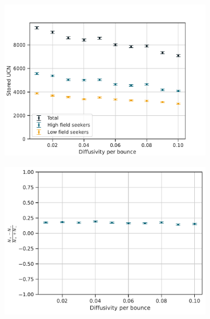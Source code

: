 \begin{figure}
\centering
\begin{subfigure}{.5\textwidth}
  \centering
  \includegraphics[width=\textwidth]{figures/stored_ucn_diffuse.pdf}
  \vspace{0pt}
  \caption{}\label{subfig:diffuse_storage_counts}
\end{subfigure}%
\begin{subfigure}{.5\textwidth}
  \centering
  \includegraphics[width=\textwidth]{figures/storage_spin_contrast_diffuse.pdf}
  \vspace{-7pt}
  \caption{}\label{subfig:diffuse_storage_contrast}
\end{subfigure}

\end{figure}

